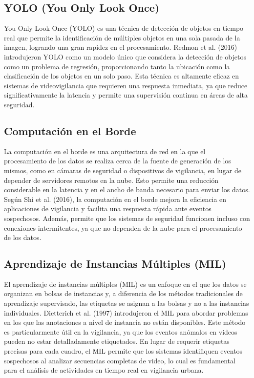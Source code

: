 \subsection{YOLO (You Only Look Once)}
You Only Look Once (YOLO) es una técnica de detección de objetos en tiempo real que permite la identificación de múltiples objetos en una sola pasada de la imagen, logrando una gran rapidez en el procesamiento. Redmon et al. (2016) introdujeron YOLO como un modelo único que considera la detección de objetos como un problema de regresión, proporcionando tanto la ubicación como la clasificación de los objetos en un solo paso. Esta técnica es altamente eficaz en sistemas de videovigilancia que requieren una respuesta inmediata, ya que reduce significativamente la latencia y permite una supervisión continua en áreas de alta seguridad.

\subsection{Computación en el Borde}
La computación en el borde es una arquitectura de red en la que el procesamiento de los datos se realiza cerca de la fuente de generación de los mismos, como en cámaras de seguridad o dispositivos de vigilancia, en lugar de depender de servidores remotos en la nube. Esto permite una reducción considerable en la latencia y en el ancho de banda necesario para enviar los datos. Según Shi et al. (2016), la computación en el borde mejora la eficiencia en aplicaciones de vigilancia y facilita una respuesta rápida ante eventos sospechosos. Además, permite que los sistemas de seguridad funcionen incluso con conexiones intermitentes, ya que no dependen de la nube para el procesamiento de los datos.

\subsection{Aprendizaje de Instancias Múltiples (MIL)}
El aprendizaje de instancias múltiples (MIL) es un enfoque en el que los datos se organizan en bolsas de instancias y, a diferencia de los métodos tradicionales de aprendizaje supervisado, las etiquetas se asignan a las bolsas y no a las instancias individuales. Dietterich et al. (1997) introdujeron el MIL para abordar problemas en los que las anotaciones a nivel de instancia no están disponibles. Este método es particularmente útil en la vigilancia, ya que los eventos anómalos en videos pueden no estar detalladamente etiquetados. En lugar de requerir etiquetas precisas para cada cuadro, el MIL permite que los sistemas identifiquen eventos sospechosos al analizar secuencias completas de video, lo cual es fundamental para el análisis de actividades en tiempo real en vigilancia urbana.